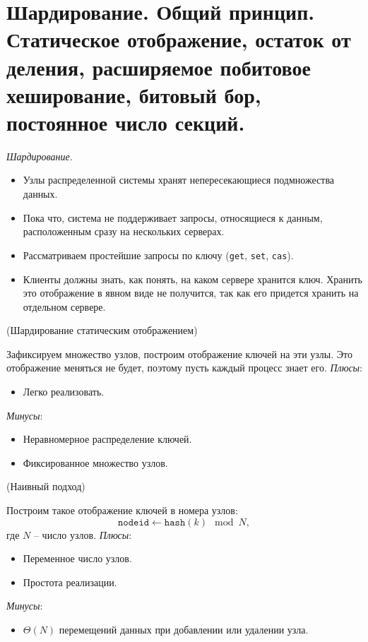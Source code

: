 \section{Шардирование. Общий принцип. Статическое отображение, 
остаток от деления, расширяемое побитовое хеширование, битовый бор, 
постоянное число секций.}

\begin{definition}
    \textit{Шардирование}.
    \begin{itemize}
        \item Узлы распределенной системы хранят непересекающиеся
            подмножества данных.
        \item Пока что, система не поддерживает запросы, относящиеся к данным,
            расположенным сразу на нескольких серверах.
        \item Рассматриваем простейшие запросы по ключу (\texttt{get}, \texttt{set},
            \texttt{cas}).
        \item Клиенты должны знать, как понять, на каком сервере хранится ключ.
            Хранить это отображение в явном виде не получится, так как его придется
            хранить на отдельном сервере.
    \end{itemize}
\end{definition}

\begin{algorithm}(Шардирование статическим отображением)

    Зафиксируем множество узлов, построим отображение ключей на эти узлы.
    Это отображение меняться не будет, поэтому пусть каждый процесс знает его.
    \textit{Плюсы}:
    \begin{itemize}
        \item Легко реализовать.
    \end{itemize}
    \textit{Минусы}:
    \begin{itemize}
        \item Неравномерное распределение ключей.
        \item Фиксированное множество узлов.
    \end{itemize}
\end{algorithm}

\begin{algorithm}(Наивный подход)

    Построим такое отображение ключей в номера узлов:
    \[
        \texttt{nodeid} \leftarrow \texttt{hash}(k) \mod N
    ,\]
    где $N$ -- число узлов.
    \textit{Плюсы}:
    \begin{itemize}
        \item Переменное число узлов.
        \item Простота реализации.
    \end{itemize}
    \textit{Минусы}:
    \begin{itemize}
        \item $\Theta(N)$ перемещений данных при добавлении или удалении узла.
    \end{itemize}
\end{algorithm}


